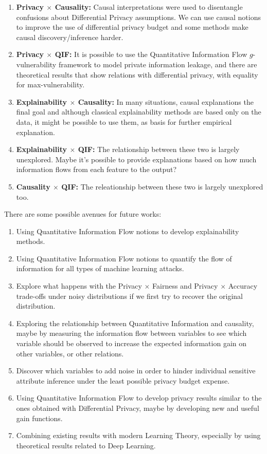 \documentclass[conference]{IEEEtran}
\begin{document}
\begin{enumerate}
    \item \textbf{Privacy $\times$ Causality:} Causal interpretations were used to disentangle confusions about Differential Privacy assumptions. We can use causal notions to improve the use of differential privacy budget and some methods make causal discovery/inference harder.
    \item \textbf{Privacy $\times$ QIF:} It is possible to use the Quantitative Information Flow $g$-vulnerability framework to model private information leakage, and there are theoretical results that show relations with differential privacy, with equality for max-vulnerability.
    \item \textbf{Explainability $\times$ Causality:} In many situations, causal explanations the final goal and although classical explainability methods are based only on the data, it might be possible to use them, as basis for further empirical explanation.
    \item \textbf{Explainability $\times$ QIF:} The relationship between these two is largely unexplored. Maybe it's possible to provide explanations based on how much information flows from each feature to the output?
    \item \textbf{Causality $\times$ QIF:} The releationship between these two is largely unexplored too.
\end{enumerate}

There are some possible avenues for future works:

\begin{enumerate}
    \item Using Quantitative Information Flow notions to develop explainability methods.
    \item Using Quantitative Information Flow notions to quantify the flow of information for all types of machine learning attacks.
    \item Explore what happens with the Privacy $\times$ Fairness and Privacy $\times$ Accuracy trade-offs under noisy distributions if we first try to recover the original distribution.
    \item Exploring the relationship between Quantitative Information and causality, maybe by measuring the information flow between variables to see which variable should be observed to increase the expected information gain on other variables, or other relations.
    \item Discover which variables to add noise in order to hinder individual sensitive attribute inference under the least possible privacy budget expense.
    \item Using Quantitative Information Flow to develop privacy results similar to the ones obtained with Differential Privacy, maybe by developing new and useful gain functions.
    \item Combining existing results with modern Learning Theory, especially by using theoretical results related to Deep Learning.
\end{enumerate}
\end{document}
